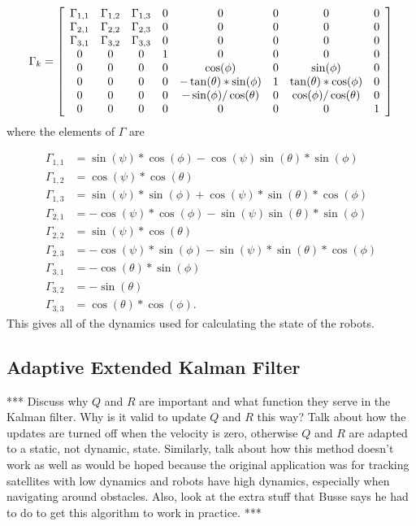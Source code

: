 \begin{align*}
\Gamma_k = \left[\begin{array}{c c c c c c c c}
\Gamma_{1,1} & \Gamma_{1,2} & \Gamma_{1,3} & 0 & 0 & 0 & 0 & 0 \\
\Gamma_{2,1} & \Gamma_{2,2} & \Gamma_{2,3} & 0 & 0 & 0 & 0 & 0 \\
\Gamma_{3,1} & \Gamma_{3,2} & \Gamma_{3,3} & 0 & 0 & 0 & 0 & 0 \\
0 & 0 & 0 & 1 & 0 & 0 & 0 & 0 \\
0 & 0 & 0 & 0 & \cos(\phi) & 0 & \sin(\phi) & 0 \\
0 & 0 & 0 & 0 & -\tan(\theta)*\sin(\phi) & 1 & \tan(\theta)*\cos(\phi) & 0 \\
0 & 0 & 0 & 0 & -\sin(\phi) / \cos(\theta) & 0 & \cos(\phi)/\cos(\theta) & 0 \\
0 & 0 & 0 & 0 & 0 & 0 & 0 & 1
\end{array}\right]
\end{align*}
where the elements of $\Gamma$ are

\begin{align*}
\Gamma_{1,1} &= \sin(\psi)*\cos(\phi)-\cos(\psi)\sin(\theta)*\sin(\phi) \\
\Gamma_{1,2} &= \cos(\psi)*\cos(\theta) \\
\Gamma_{1,3} &= \sin(\psi)*\sin(\phi)+\cos(\psi)*\sin(\theta)*\cos(\phi) \\
\Gamma_{2,1} &= -\cos(\psi)*\cos(\phi)-\sin(\psi)\sin(\theta)*\sin(\phi) \\
\Gamma_{2,2} &= \sin(\psi)*\cos(\theta) \\
\Gamma_{2,3} &= -\cos(\psi)*\sin(\phi)-\sin(\psi)*\sin(\theta)*\cos(\phi) \\
\Gamma_{3,1} &= -\cos(\theta)*\sin(\phi) \\
\Gamma_{3,2} &= -\sin(\theta) \\
\Gamma_{3,3} &= \cos(\theta)*\cos(\phi).
\end{align*}
This gives all of the dynamics used for calculating the state of the robots.

\subsection{Adaptive Extended Kalman Filter}
\label{sec:adaptiveekf}
*** Discuss why $Q$ and $R$ are important and what function they serve in the Kalman filter. Why is it valid to update $Q$ and $R$ this way? Talk about how the updates are turned off when the velocity is zero, otherwise $Q$ and $R$ are adapted to a static, not dynamic, state. Similarly, talk about how this method doesn't work as well as would be hoped because the original application was for tracking satellites with low dynamics and robots have high dynamics, especially when navigating around obstacles. Also, look at the extra stuff that Busse says he had to do to get this algorithm to work in practice. ***

